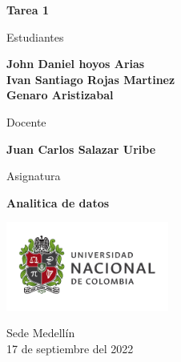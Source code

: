 \begin{titlepage}
   \Large{
   \begin{center}
       \vspace*{1cm}

       \textbf{Tarea 1}

            
       \vspace{1.1cm}
       
       Estudiantes
       
       \vspace{0.5cm}
        
	     \textbf{John Daniel hoyos Arias} \\

       \textbf{Ivan Santiago Rojas Martinez} \\
       
       \textbf{Genaro Aristizabal}



              \vspace{1cm}
       
       Docente
       
       \vspace{0.5cm}

       \textbf{Juan Carlos Salazar Uribe}
       
       \vspace{0.4cm}

       \vspace{1.4cm}
       
       Asignatura
       
       \vspace{0.5cm}

       \textbf{Analitica de datos}

       \vfill

            
       \vspace{0.4cm}
     
       \includegraphics[width=0.4\textwidth]{DocumentFormat/logounal.png}
            
       Sede Medellín\\
       17 de septiembre del 2022
       
   \end{center}
   }
\end{titlepage}